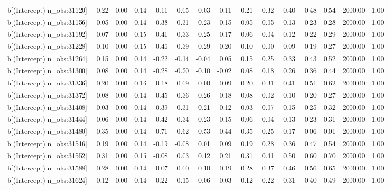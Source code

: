 \begin{table}[ht]
\begin{tabular}{rrrrrrrrrrrrrrr}
  b[(Intercept) n\_obs:31120] & 0.22 & 0.00 & 0.14 & -0.11 & -0.05 & 0.03 & 0.11 & 0.21 & 0.32 & 0.40 & 0.48 & 0.54 & 2000.00 & 1.00 \\ 
  b[(Intercept) n\_obs:31156] & -0.05 & 0.00 & 0.14 & -0.38 & -0.31 & -0.23 & -0.15 & -0.05 & 0.05 & 0.13 & 0.23 & 0.28 & 2000.00 & 1.00 \\ 
  b[(Intercept) n\_obs:31192] & -0.07 & 0.00 & 0.15 & -0.41 & -0.33 & -0.25 & -0.17 & -0.06 & 0.04 & 0.12 & 0.22 & 0.29 & 2000.00 & 1.00 \\ 
  b[(Intercept) n\_obs:31228] & -0.10 & 0.00 & 0.15 & -0.46 & -0.39 & -0.29 & -0.20 & -0.10 & 0.00 & 0.09 & 0.19 & 0.27 & 2000.00 & 1.00 \\ 
  b[(Intercept) n\_obs:31264] & 0.15 & 0.00 & 0.14 & -0.22 & -0.14 & -0.04 & 0.05 & 0.15 & 0.25 & 0.33 & 0.43 & 0.52 & 2000.00 & 1.00 \\ 
  b[(Intercept) n\_obs:31300] & 0.08 & 0.00 & 0.14 & -0.28 & -0.20 & -0.10 & -0.02 & 0.08 & 0.18 & 0.26 & 0.36 & 0.44 & 2000.00 & 1.00 \\ 
  b[(Intercept) n\_obs:31336] & 0.20 & 0.00 & 0.16 & -0.18 & -0.09 & 0.00 & 0.09 & 0.20 & 0.31 & 0.41 & 0.51 & 0.62 & 2000.00 & 1.00 \\ 
  b[(Intercept) n\_obs:31372] & -0.08 & 0.00 & 0.14 & -0.45 & -0.36 & -0.26 & -0.18 & -0.08 & 0.02 & 0.10 & 0.20 & 0.27 & 2000.00 & 1.00 \\ 
  b[(Intercept) n\_obs:31408] & -0.03 & 0.00 & 0.14 & -0.39 & -0.31 & -0.21 & -0.12 & -0.03 & 0.07 & 0.15 & 0.25 & 0.32 & 2000.00 & 1.00 \\ 
  b[(Intercept) n\_obs:31444] & -0.06 & 0.00 & 0.14 & -0.42 & -0.34 & -0.23 & -0.15 & -0.06 & 0.04 & 0.13 & 0.23 & 0.31 & 2000.00 & 1.00 \\ 
  b[(Intercept) n\_obs:31480] & -0.35 & 0.00 & 0.14 & -0.71 & -0.62 & -0.53 & -0.44 & -0.35 & -0.25 & -0.17 & -0.06 & 0.01 & 2000.00 & 1.00 \\ 
  b[(Intercept) n\_obs:31516] & 0.19 & 0.00 & 0.14 & -0.19 & -0.08 & 0.01 & 0.09 & 0.19 & 0.28 & 0.36 & 0.47 & 0.54 & 2000.00 & 1.00 \\ 
  b[(Intercept) n\_obs:31552] & 0.31 & 0.00 & 0.15 & -0.08 & 0.03 & 0.12 & 0.21 & 0.31 & 0.41 & 0.50 & 0.60 & 0.70 & 2000.00 & 1.00 \\ 
  b[(Intercept) n\_obs:31588] & 0.28 & 0.00 & 0.14 & -0.07 & 0.00 & 0.10 & 0.19 & 0.28 & 0.37 & 0.46 & 0.56 & 0.65 & 2000.00 & 1.00 \\ 
  b[(Intercept) n\_obs:31624] & 0.12 & 0.00 & 0.14 & -0.22 & -0.15 & -0.06 & 0.03 & 0.12 & 0.22 & 0.31 & 0.40 & 0.49 & 2000.00 & 1.00 \\ 

\end{tabular}
\end{table}
